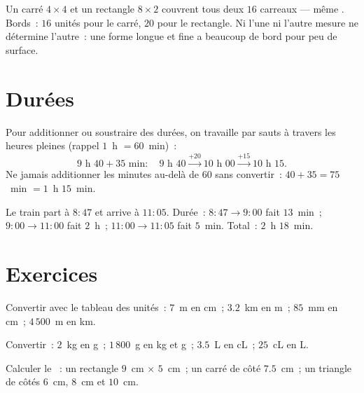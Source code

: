 \begin{example}\label{ex:g4:measure:samearea}
Un carré $4 \times 4$ et un rectangle $8 \times 2$ couvrent tous
deux $16$ carreaux --- même . Bords~: $16$ unités pour le
carré, $20$ pour le rectangle. Ni l'une ni l'autre mesure ne
détermine l'autre~: une forme longue et fine a beaucoup de bord
pour peu de surface.
\end{example}

\section{Durées}

\begin{method}\label{met:g4:measure:time}
Pour additionner ou soustraire des durées, on travaille par
sauts à travers les heures pleines (rappel $1$~h $= 60$~min)~:
\[
9\text{ h }40 + 35 \text{ min}:
\quad 9\text{ h }40 \xrightarrow{+20} 10\text{ h }00
\xrightarrow{+15} 10\text{ h }15 .
\]
Ne jamais additionner les minutes au-delà de $60$ sans convertir~:
$40 + 35 = 75$~min $= 1$~h $15$~min.
\end{method}

\begin{example}\label{ex:g4:measure:timetable}
Le train part à $8{:}47$ et arrive à $11{:}05$. Durée~:
$8{:}47 \to 9{:}00$ fait $13$~min~; $9{:}00 \to 11{:}00$ fait
$2$~h~; $11{:}00 \to 11{:}05$ fait $5$~min. Total~: $2$~h $18$~min.
\end{example}

\section{Exercices}

\begin{exercise}[$\star$]\label{exo:g4:measure:1}
Convertir avec le tableau des unités~: $7$~m en cm~; $3.2$~km en
m~; $85$~mm en cm~; $4\,500$~m en km.
\end{exercise}

\begin{exercise}[$\star$]\label{exo:g4:measure:2}
Convertir~: $2$~kg en g~; $1\,800$~g en kg et g~; $3.5$~L en cL~;
$25$~cL en L.
\end{exercise}

\begin{exercise}[$\star$]\label{exo:g4:measure:3}
Calculer le ~: un rectangle $9$~cm $\times$ $5$~cm~; un
carré de côté $7.5$~cm~; un triangle de côtés $6$~cm, $8$~cm et
$10$~cm.
\end{exercise}

